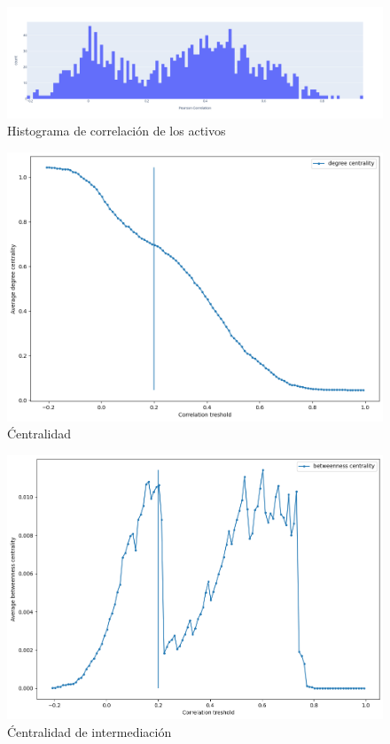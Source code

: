 \documentclass[runningheads,legalpaper,10pt]{etc/llncs}
\begin{document}
\begin{figure}[htp]
    \centering
    \includegraphics[scale=0.3]{images/correlation_hist.png}
    \caption{Histograma de correlación de los activos}
    \label{fig:hist_corr}
\end{figure}

\begin{figure}[htp]
    \centering
    \includegraphics[scale=0.3]{images/degree_centrality.png}
    \caption{Ćentralidad}
    \label{fig:degree_centrality}
\end{figure}

\begin{figure}[htp]
    \centering
    \includegraphics[scale=0.3]{images/betweeness_centrality.png}
    \caption{Ćentralidad de intermediación}
    \label{fig:btw_centrality}
\end{figure}
\end{document}
